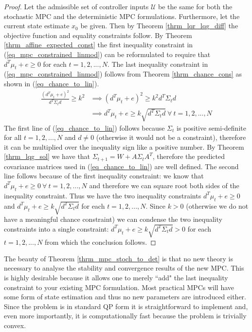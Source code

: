 \begin{proof}
Let the admissible set of controller inputs $\mathcal{U}$ be the same for both the stochastic MPC and the deterministic MPC formulations. Furthermore, let the current state estimate $x_0$ be given. Then by Theorem \ref{thrm_lqr_lqg_diff} the objective function and equality constraints follow. By Theorem \ref{thrm_affine_expected_const} the first inequality constraint in (\ref{eq_mpc_constrained_linmod}) can be reformulated to require that $d^T\mu_t + e \geq 0$ for each $t=1, 2,..., N$. The last inequality constraint in (\ref{eq_mpc_constrained_linmod}) follows from Theorem \ref{thrm_chance_cons} as shown in (\ref{eq_chance_to_lin}).
\begin{equation}
\begin{aligned}
\frac{(d^T\mu_t+e)^2}{d^T \Sigma_t d} \geq k^2 &\implies (d^T\mu_t+e)^2 \geq k^2 {d^T \Sigma_t d} \\
&\implies d^T\mu_t+e \geq k \sqrt{d^T \Sigma_t d}~\forall~t=1, 2,..., N
\end{aligned}
\label{eq_chance_to_lin}
\end{equation}
The first line of (\ref{eq_chance_to_lin}) follows because $\Sigma_t$ is positive semi-definite for all $t=1, 2,..., N$ and $d \neq 0$ (otherwise it would not be a constraint), therefore it can be multiplied over the inequality sign like a positive number. By Theorem \ref{thrm_lqg_sol} we have that $\Sigma_{t+1} = W + A\Sigma_tA^T$, therefore the predicted covariance matrices used in (\ref{eq_chance_to_lin}) are well defined. The second line follows because of the first inequality constraint: we know that $d^T\mu_t+e \geq 0 ~\forall~t=1,2,..., N$ and therefore we can square root both sides of the inequality constraint. Thus we have the two inequality constraints $d^T\mu_t+e \geq 0$ and $d^T\mu_t+e \geq k \sqrt{d^T \Sigma_t d}$ for each $t=1,2,...,N$. Since $k > 0$ (otherwise we do not have a meaningful chance constraint) we can condense the two inequality constraints into a single constraint: $d^T\mu_t+e \geq k \sqrt{d^T \Sigma_t d} > 0$ for each $t=1,2,...,N$ from which the conclusion follows.  
\end{proof}
The beauty of Theorem \ref{thrm_mpc_stoch_to_det} is that no new theory is necessary to analyse the stability and convergence results of the new MPC. This is highly desirable because it allows one to merely ``add" the last inequality constraint to your existing MPC formulation. Most practical MPCs will have some form of state estimation and thus no new parameters are introduced either. Since the problem is in standard QP form it is straightforward to implement and, even more importantly, it is computationally fast because the problem is trivially convex.

